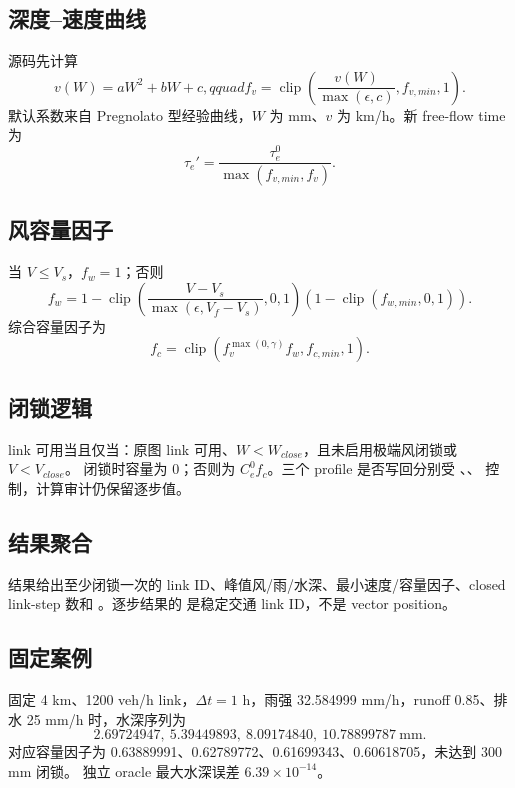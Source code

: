 \subsection{深度--速度曲线}
源码先计算
\begin{equation}
 v(W)=aW^2+bW+c,qquad
 f_v=\operatorname{clip}\left(\frac{v(W)}{\max(\epsilon,c)},f_{v,min},1\right).
\end{equation}
默认系数来自 Pregnolato 型经验曲线，$W$ 为 mm、$v$ 为 km/h。新 free-flow time 为
\begin{equation}
 \tau_e'=\frac{\tau_e^0}{\max(f_{v,min},f_v)}.
\end{equation}

\subsection{风容量因子}
当 $V\le V_s$，$f_w=1$；否则
\begin{equation}
 f_w=1-\operatorname{clip}\left(
 \frac{V-V_s}{\max(\epsilon,V_f-V_s)},0,1\right)
 (1-\operatorname{clip}(f_{w,min},0,1)).
\end{equation}
综合容量因子为
\begin{equation}
 f_c=\operatorname{clip}(f_v^{\max(0,\gamma)}f_w,f_{c,min},1).
\end{equation}

\subsection{闭锁逻辑}
link 可用当且仅当：原图 link 可用、$W<W_{close}$，且未启用极端风闭锁或 $V<V_{close}$。
闭锁时容量为 0；否则为 $C_e^0f_c$。三个 profile 是否写回分别受
、、
 控制，计算审计仍保留逐步值。

\subsection{结果聚合}
结果给出至少闭锁一次的 link ID、峰值风/雨/水深、最小速度/容量因子、closed link-step 数和
。逐步结果的  是稳定交通 link ID，不是 vector position。

\subsection{固定案例}
固定 4 km、1200 veh/h link，$\Delta t=1$ h，雨强 32.584999 mm/h，runoff 0.85、排水
25 mm/h 时，水深序列为
\begin{equation}
 2.69724947,\ 5.39449893,\ 8.09174840,\ 10.78899787\ \mathrm{mm}.
\end{equation}
对应容量因子为 0.63889991、0.62789772、0.61699343、0.60618705，未达到 300 mm 闭锁。
独立 oracle 最大水深误差 $6.39\times10^{-14}$。

